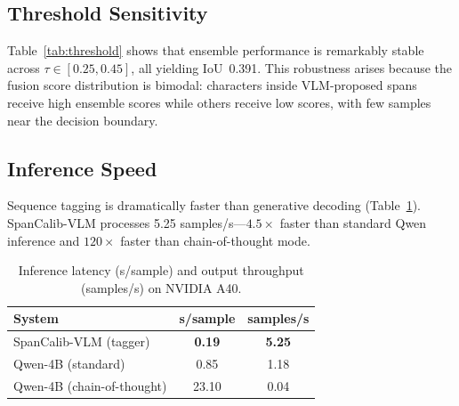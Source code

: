 \documentclass[11pt]{article}
\begin{document}
\subsection{Threshold Sensitivity}

Table~\ref{tab:threshold} shows that ensemble performance is remarkably stable across $\tau \in [0.25, 0.45]$, all yielding IoU~0.391. This robustness arises because the fusion score distribution is bimodal: characters inside VLM-proposed spans receive high ensemble scores while others receive low scores, with few samples near the decision boundary.

\begin{table}[t]
\centering
\caption{Threshold grid search for the ensemble.}
\label{tab:threshold}
\end{table}




\subsection{Inference Speed}

Sequence tagging is dramatically faster than generative decoding (Table~\ref{tab:speed}). SpanCalib-VLM processes 5.25 samples/s---$4.5\times$ faster than standard Qwen inference and $120\times$ faster than chain-of-thought mode.

\begin{table}[t]
\centering
\caption{Inference latency (s/sample) and output throughput (samples/s) on NVIDIA A40.}
\label{tab:speed}
\small
\begin{tabular}{@{}lcc@{}}
\toprule
\textbf{System} & \textbf{s/sample} & \textbf{samples/s} \\
\midrule
SpanCalib-VLM (tagger) & \textbf{0.19} & \textbf{5.25} \\
Qwen-4B (standard) & 0.85 & 1.18 \\
Qwen-4B (chain-of-thought) & 23.10 & 0.04 \\
\bottomrule
\end{tabular}
\end{table}
\end{document}
